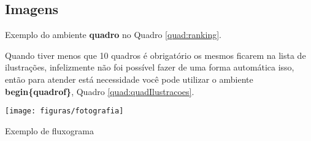 \lipsum[1-1]


\subsection{Imagens}
Exemplo do ambiente \textbf{quadro} no Quadro \ref{quad:ranking}.
\begin{quadro}[htb]
\end{quadro}

\newpage
Quando tiver menos que 10 quadros é obrigatório os mesmos ficarem na lista de ilustrações, infelizmente não foi possível fazer de uma forma automática isso, então para atender está necessidade você pode utilizar o ambiente \textbf{begin\{quadrof\}},  Quadro \ref{quad:quadIlustracoes}.


\begin{quadrof}[htb]
\end{quadrof}

\begin{grafico}[htb]
\end{grafico}

\begin{fotografia}[htb]
  {
  	\texttt{[image: figuras/fotografia]}
 } {
 }
\end{fotografia}

\begin{fluxograma}[htb]
	\caption{Exemplo de fluxograma}
	\label{flux:grafico4}
\end{fluxograma}



